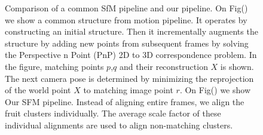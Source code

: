 \begin{figure}[!htbp]
        
        \caption[Comparison of a common structure from motion (SfM) pipeline and our pipeline.]{ Comparison of a common SfM pipeline and our pipeline. On Fig() we show a common structure from motion pipeline. It operates by constructing an initial structure. Then it incrementally augments the structure by adding new points from subsequent frames by solving the Perspective n Point (PnP) 2D to 3D correspondence problem. In the figure, matching points $p$,$q$ and their reconstruction $X$ is shown. The next camera pose is determined by minimizing the reprojection of the world point $X$ to matching image point $r$. On Fig() we show Our SFM pipeline. Instead of aligning entire frames, we align the fruit clusters individually. The average scale factor of these individual alignments are used to align non-matching clusters.}
\label{fig:sfmpipelines}
\end{figure}


